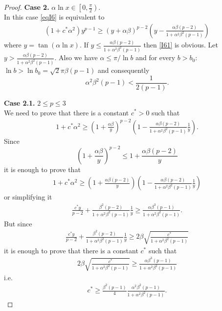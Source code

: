 \documentclass{amsart}
\theoremstyle{definition}
\theoremstyle{remark}
\numberwithin{equation}{section}
\begin{document}
\begin{proof}
	
	
	\textbf{Case 2.} $\alpha\ln x\in \left[0,\frac{\pi}{2} \right)$.\\
		In this case \eqref{eqI6} is equivalent to
	\begin{align}\label{I61}
\left(1+c^*\alpha^2 \right)y^{p-1}\geq \left(y+\alpha \beta \right)^{p-2}
\left(y-\frac{\alpha\beta(p-2)}{1+\alpha^2\beta^2(p-1)} \right)
\end{align}
	where $y=\tan(\alpha\ln x)$.
	If $	y\le \frac{\alpha\beta (p-2)}{1+\alpha^2\beta^2(p-1)}$ then
	\eqref{I61} is obvious.
	Let
	$y> \frac{\alpha\beta (p-2)}{1+\alpha^2\beta^2(p-1)}$.
Also we have $\alpha\le \pi/\ln b$ and for every $b>b_0$:   
$\ln b> \ln b_0=\sqrt 2 \pi  \beta (p-1)$
and consequently
\begin{equation}\label{eq3.2-2}
\alpha^2\beta^2(p-1)<\frac{1}{2(p-1)}.
\end{equation}
		
	\textbf{Case 2.1.} $2\le p\le 3$\\
	We need to prove that there is a constant $c^*>0$ such that
     \begin{align*}
1+c^*\alpha^2\geq \left(1+\frac{\alpha \beta}{y} \right)^{p-2} 
\left(1-\frac{\alpha\beta(p-2)}{1+\alpha^2\beta^2(p-1)}\frac{1}{y} \right).
\end{align*}	
	Since
	\[
	\left(1+\frac{\alpha \beta}{y} \right)^{p-2} \le 1+\frac{\alpha\beta(p-2)}{y}
	\]
	it is enough to prove that 
	\begin{align*}
1+c^*\alpha^2\geq \left(1+\frac{\alpha\beta(p-2)}{y}\right)
\left(1-\frac{\alpha\beta(p-2)}{1+\alpha^2\beta^2(p-1)}\frac{1}{y} \right)
\end{align*}
	or simplifying it
	\begin{align*}
\frac{c^*y}{p-2}+\frac{\beta^2(p-2)}{1+\alpha^2\beta^2(p-1)}\frac{1}{y}
\geq \frac{\alpha \beta^3(p-1)}{1+\alpha^2\beta^2(p-1)}.
	\end{align*}
	But since 
	\begin{align*}
\frac{c^*y}{p-2}+\frac{\beta^2(p-2)}{1+\alpha^2\beta^2(p-1)}\frac{1}{y}
\geq 2\beta\sqrt{\frac{c^*}{1+\alpha^2\beta^2(p-1)}}     
	\end{align*}
it is enough to prove that there is a constant $c^*$ such that
\begin{align*}
 2\beta\sqrt{\frac{c^*}{1+\alpha^2\beta^2(p-1)}} \geq  
  \frac{\alpha \beta^3(p-1)}{1+\alpha^2\beta^2(p-1)}  
	\end{align*}
i.e.
\begin{align*}
c^* \geq  \frac{\beta^2(p-1)}{4}
  \frac{\alpha^2 \beta^2(p-1)}{1+\alpha^2\beta^2(p-1)}.  
	\end{align*}
	

\end{proof}
\end{document}
